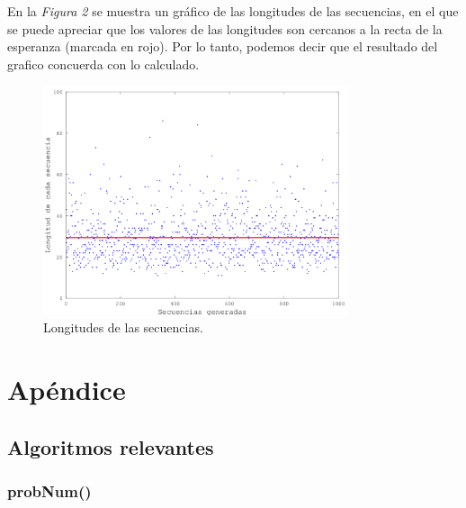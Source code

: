 \documentclass{article}
\begin{document}
\medskip
En la \textit{Figura 2} se muestra un gráfico de las longitudes de las secuencias, en el que se puede apreciar que los valores de las longitudes son cercanos a la recta de la esperanza (marcada en rojo). Por lo tanto, podemos decir que el resultado del grafico concuerda con lo calculado. \\

\begin{figure}[h]
	\centering
	\includegraphics[width=0.80\textwidth]{images/longitudes.png}
	\caption{Longitudes de las secuencias.}
\end{figure}
\bigskip


\section{Apéndice}
\subsection{Algoritmos relevantes}
\subsubsection{probNum()}
\end{document}
